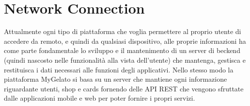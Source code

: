 \section{Network Connection}

Attualmente ogni tipo di piattaforma che voglia permettere al proprio
utente di accedere da remoto, e quindi da qualsiasi dispositivo, alle
proprie informazioni ha come parte fondamentale lo sviluppo e il mantenimento
di un server di beckend (quindi nascosto nelle funzionalità alla vista
dell'utente) che mantenga, gestisca e restituisca i dati necessari
alle funzioni degli applicativi. Nello stesso modo la piattaforma
MyGelato si basa su un server che mantiene ogni informazione riguardante
utenti, shop e cards fornendo delle API REST che vengono sfruttate
dalle applicazioni mobile e web per poter fornire i propri servizi.

